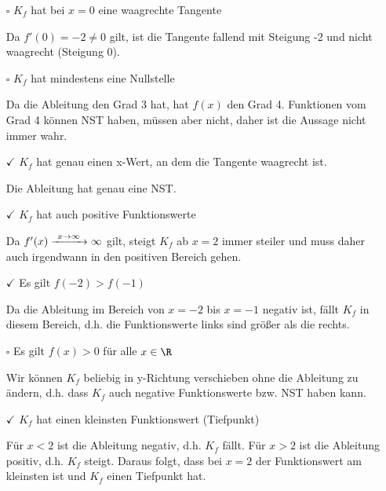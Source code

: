 \begin{Answer}[ref=ableitungInterpretationA1]

	\begin{itemize}
		\item[$\square$] \(K_f\) hat bei \(x=0\) eine waagrechte Tangente

		Da \(f'(0)=-2\neq 0\) gilt, ist die Tangente fallend mit Steigung -2 und nicht waagrecht (Steigung 0).
		\item[$\square$] \(K_f\) hat mindestens eine Nullstelle

		Da die Ableitung den Grad 3 hat, hat \(f(x)\) den Grad 4. Funktionen vom Grad 4 können NST haben, müssen aber nicht, daher ist die Aussage nicht immer wahr.
		\item[$\checkmark$] \(K_f\) hat genau einen x-Wert, an dem die Tangente waagrecht ist.

		Die Ableitung hat genau eine NST.
		\item[$\checkmark$] \(K_f\) hat auch positive Funktionswerte

		Da \(f'(x)\xrightarrow{\hphantom{\ }x\to\infty\hphantom{\ }}\infty\) gilt, steigt \(K_f\) ab \(x=2\) immer steiler und muss daher auch irgendwann in den positiven Bereich gehen.
		\item[$\checkmark$] Es gilt \(f(-2)>f(-1)\)

		Da die Ableitung im Bereich von \(x=-2\) bis \(x=-1\) negativ ist, fällt \(K_f\) in diesem Bereich, d.h. die Funktionswerte links sind größer als die rechts.
		\item[$\square$] Es gilt \(f(x)>0\) für alle \(x\in\R\)

		Wir können \(K_f\) beliebig in y-Richtung verschieben ohne die Ableitung zu ändern, d.h. dass \(K_f\) auch negative Funktionswerte bzw. NST haben kann.
		\item[$\checkmark$] \(K_f\) hat einen kleinsten Funktionswert (Tiefpunkt)

		Für \(x<2\) ist die Ableitung negativ, d.h. \(K_f\) fällt. Für \(x>2\) ist die Ableitung positiv, d.h. \(K_f\) steigt. Daraus folgt, dass bei \(x=2\) der Funktionswert am kleinsten ist und \(K_f\) einen Tiefpunkt hat.
	\end{itemize}
\end{Answer}